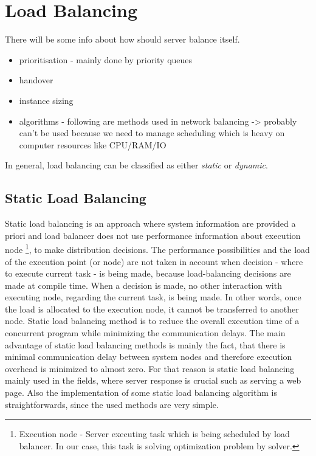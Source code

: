 
\newpage
\section{Load Balancing}\label{sec:load-balancing}
There will be some info about how should server balance itself.
\begin{itemize}
    \item prioritisation - mainly done by priority queues
    \item handover
    \item instance sizing
    \item algorithms - following are methods used in network balancing -> probably can't be used because we need to manage scheduling
    which is heavy on computer resources like CPU/RAM/IO
\end{itemize}

In general, load balancing can be classified as either \textit{static} or \textit{dynamic}.

\subsection{Static Load Balancing}\label{subsec:static-load-balancing}
Static load balancing is an approach where system information are provided a priori
and load balancer does not use performance information about execution node
\footnote{Execution node - Server executing task which is being scheduled by load balancer.
In our case, this task is solving optimization problem by solver.},
to make distribution decisions.
The performance possibilities and the load of the execution point (or node) are not taken in account
when decision - where to execute current task - is being made, because load-balancing decisions are made at compile time.
When a decision is made, no other interaction with executing node, regarding the current task, is being made.
In other words, once the load is allocated to the execution node, it cannot be transferred to another node.
Static load balancing method is to reduce the overall execution time of a concurrent program while minimizing the communication delays\cite{web:loadBalancingInGridComputing}.
The main advantage of static load balancing methods is mainly the fact, that there is minimal communication delay between system nodes
and therefore execution overhead is minimized to almost zero.
For that reason is static load balancing mainly used in the fields, where server response is crucial such as serving a web page.
Also the implementation of some static load balancing algorithm is straightforwards, since the used methods are very simple.


